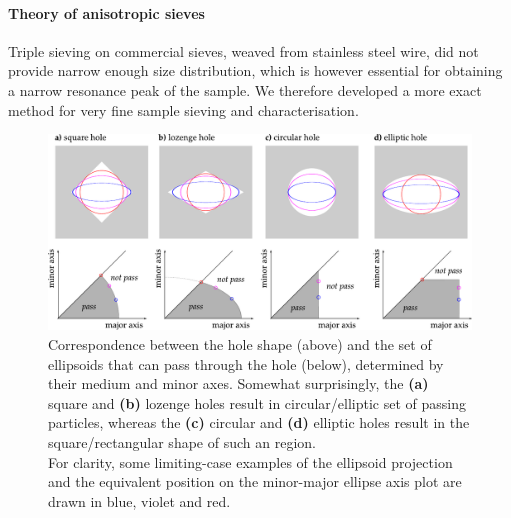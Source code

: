 \paragraph{Theory of anisotropic sieves}%
Triple sieving on commercial sieves, weaved from stainless steel wire, did not provide narrow enough size distribution, which is however essential for obtaining a narrow resonance peak of the sample. We therefore developed a more exact method for very fine sample sieving and characterisation. 

\begin{figure}[ht] \caption{Correspondence between the hole shape (above) and the set of ellipsoids that can pass through the hole (below), determined by their medium and minor axes. Somewhat surprisingly, the \textbf{(a)} square and \textbf{(b)} lozenge holes result in circular/elliptic set of passing particles, whereas the \textbf{(c)} circular and \textbf{(d)} elliptic holes result in the square/rectangular shape of such an region.\\
For clarity, some limiting-case examples of the ellipsoid projection and the equivalent position on the minor-major ellipse axis plot are drawn in blue, violet and red. } \label{fg_sieve_pass_notpass} \centering 
\includegraphics[width=\textwidth]{img/technology/sieve_pass_notpass.pdf}
\end{figure}
